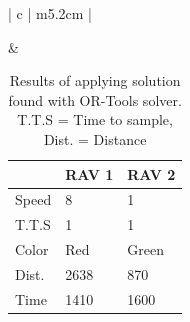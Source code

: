 \begin{table}[h!]
\begin{tabular}{ | c | m{5.2cm} | }
\begin{minipage}[c][53mm][c]{.6\textwidth}
    \end{minipage}
    &
    \small
    \begin{tabular}{m{10mm}|m{11mm} m{11mm}}
        & RAV 1 & RAV 2\\
        \hline
        Speed& 8 & 1 \\
        T.T.S & 1 & 1 \\
        Color & Red & Green \\
        \hline
        Dist.& 2638 & 870 \\
        Time& 1410 & 1600 \\
    \end{tabular}
    \normalsize
    \\
    \hline

  \end{tabular}
  \caption{Results of applying solution found with OR-Tools solver. T.T.S = Time to sample, Dist. = Distance}\label{table:ORToolsResults}
\end{table}
